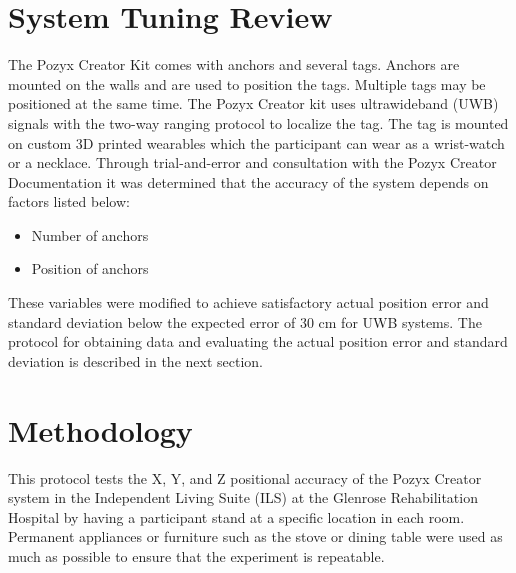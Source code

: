\section{System Tuning Review}
The Pozyx Creator Kit comes with anchors and several tags. Anchors are mounted 
on the walls and are used to position the tags. Multiple tags may be positioned
at the same time.
The Pozyx Creator kit uses ultrawideband (UWB) signals with the two-way ranging protocol to localize the tag. 
The tag is mounted on custom 3D printed wearables which the participant can wear as 
a wrist-watch or a necklace. Through trial-and-error and consultation with the Pozyx Creator Documentation
\cite{pozyx_hardware_nodate,pozyx_configuration_nodate}
it was determined that the accuracy of the system depends on factors listed below:

\begin{itemize}
    \item Number of anchors
    \item Position of anchors
\end{itemize}

These variables were modified to achieve satisfactory actual position error
and standard deviation below the expected error of 30 cm for UWB systems. The 
protocol for obtaining data and evaluating the actual position error and 
standard deviation is described in the next section.

\section{Methodology}
This protocol tests the X, Y, and Z positional accuracy of the Pozyx Creator system in the Independent
Living Suite (ILS) at the Glenrose Rehabilitation Hospital by having a participant stand at 
a specific location in each room. Permanent appliances or furniture such as the stove
or dining table were used as much as possible to ensure that the experiment is repeatable.

